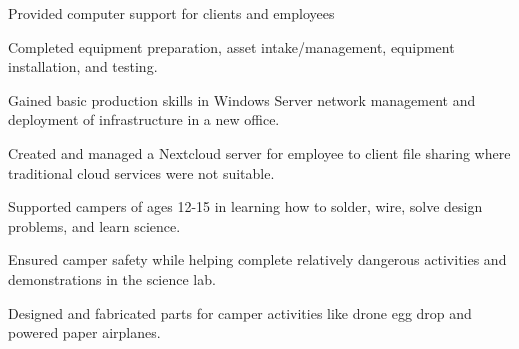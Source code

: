 \documentclass[]{deedy-resume-openfont}
\begin{document}
\begin{minipage}[t]{0.66\textwidth}
\vspace{\topsep} %
\begin{tightemize}
\item Provided computer support for clients and employees
\item Completed equipment preparation, asset intake/management, equipment installation, and testing.
\item Gained basic production skills in Windows Server network management and deployment of infrastructure in a new office.
\item Created and managed a Nextcloud server for employee to client file sharing where traditional cloud services were not suitable.
\end{tightemize}
\sectionsep

\vspace{\topsep} %
\begin{tightemize}
\item Supported campers of ages 12-15 in learning how to solder, wire, solve design problems, and learn science. 
\item Ensured camper safety while helping complete relatively dangerous activities and demonstrations in the science lab.
\item Designed and fabricated parts for camper activities like drone egg drop and powered paper airplanes.
 
\end{tightemize}
\sectionsep

\end{minipage}
\pagebreak

\end{document}
